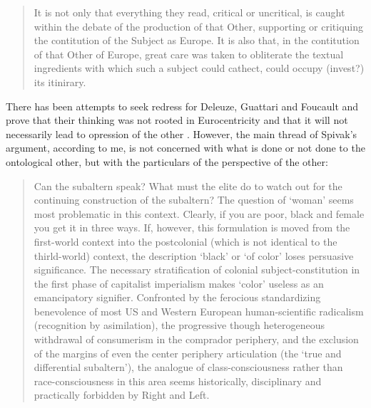 \documentclass[a4paper]{article}
\begin{document}
\begin{quote}
   It is not only that everything they read, critical or uncritical, is caught within the debate   of the production of that Other, supporting or critiquing the contitution of the Subject as   Europe.  It is also that, in the contitution of that Other of Europe, great care was taken to   obliterate the textual ingredients with which such a subject could cathect, could occupy (invest?) its   itinirary. \citep[p. 75]{spivak1988}
\end{quote}

There has been attempts to seek redress for Deleuze, Guattari and Foucault and prove that their thinking was not rooted in Eurocentricity and that it will not necessarily lead to opression of the other \citep[e.g.][]{robinson2010}. However, the main thread of Spivak's argument, according to me, is not concerned with what is done or not done to the ontological other, but with the particulars of the perspective of the other:

\begin{quote}
Can the subaltern speak? What must the elite do to watch out for the continuing construction   of the subaltern? The question of `woman' seems most problematic in this context. Clearly, if   you are poor, black and female you get it in three ways. If, however, this formulation is   moved from the first-world context into the postcolonial (which is not identical to the   thirld-world) context, the description `black' or `of color' loses persuasive   significance. The necessary stratification of colonial subject-constitution in the first phase   of capitalist imperialism makes `color' useless as an emancipatory signifier. Confronted by   the ferocious standardizing benevolence of most US and Western European human-scientific   radicalism (recognition by asimilation), the progressive though heterogeneous withdrawal of   consumerism in the comprador periphery, and the exclusion of the margins of even the center   periphery articulation (the `true and differential subaltern'), the analogue of   class-consciousness rather than race-consciousness in this area seems historically,   disciplinary and practically forbidden by Right and Left. \citep[p. 90]{spivak1988}
\end{quote}
\end{document}
